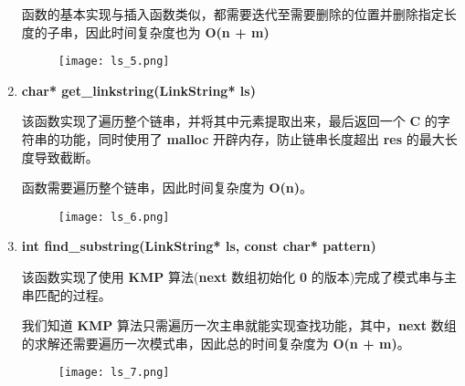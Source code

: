 \begin{enumerate}
                    \par 函数的基本实现与插入函数类似，都需要迭代至需要删除的位置并删除指定长度的子串，因此时间复杂度也为 \textbf{O(n + m)}
                    \begin{figure*}[htbp]
                        \texttt{[image: ls\_5.png]}
                    \end{figure*}
                \newpage
                \item \textbf{char* get\_linkstring(LinkString* ls)}
                    \par 该函数实现了遍历整个链串，并将其中元素提取出来，最后返回一个 \textbf{C} 的字符串的功能，同时使用了 \textbf{malloc} 开辟内存，防止链串长度超出 \textbf{res} 的最大长度导致截断。
                    \par 函数需要遍历整个链串，因此时间复杂度为 \textbf{O(n)}。
                    \begin{figure*}[htbp]
                        \texttt{[image: ls\_6.png]}
                    \end{figure*}
                \item \textbf{int find\_substring(LinkString* ls, const char* pattern)}
                    \par 该函数实现了使用 \textbf{KMP} 算法(\textbf{next} 数组初始化 \textbf{0} 的版本)完成了模式串与主串匹配的过程。
                    \par 我们知道 \textbf{KMP} 算法只需遍历一次主串就能实现查找功能，其中，\textbf{next} 数组的求解还需要遍历一次模式串，因此总的时间复杂度为 \textbf{O(n + m)}。
                    \begin{figure*}[htbp]
                        \texttt{[image: ls\_7.png]}
                    \end{figure*}
            \end{enumerate}
